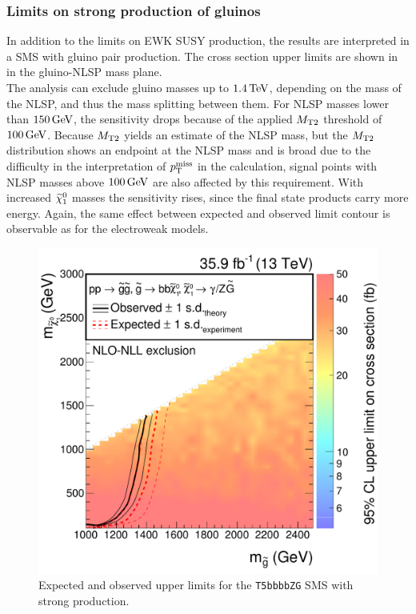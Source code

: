 \subsubsection*{Limits on strong production of gluinos}
In addition to the limits on EWK SUSY production, the results are interpreted in a SMS with gluino pair production. The cross section upper limits are shown in  in the gluino-NLSP mass plane.\\
The analysis can exclude gluino masses up to $1.4\,\text{Te\hspace{-.08em}V}$, depending on the mass of the NLSP, and thus the mass splitting between them. For NLSP masses lower than $150\,\text{Ge\hspace{-.08em}V}$, the sensitivity drops because of the applied $M_{\mathrm{T2}}$ threshold of $100\,\text{Ge\hspace{-.08em}V}$. Because $M_{\mathrm{T2}}$ yields an estimate of the NLSP mass, but the $M_{\mathrm{T2}}$ distribution shows an endpoint at the NLSP mass and is broad due to the difficulty in the interpretation of $p_{\mathrm{T}}^\text{miss}$ in the calculation, signal points with NLSP masses above $100\,\text{Ge\hspace{-.08em}V}$ are also affected by this requirement. With increased $\widetilde{\chi}^{0}_{1}$ masses the sensitivity rises, since the final state products carry more energy. Again, the same effect between expected and observed limit contour is observable as for the electroweak models.

\begin{figure}[tbp]
 \centering
 \includegraphics[width=\pairwidth]{figures/EndorsementPlots/T5bbbbZg_limits_XSEC2}
 \caption{Expected and observed upper limits for the \texttt{T5bbbbZG} SMS with strong production.}
 \label{fig:limitStrong}
\end{figure}
